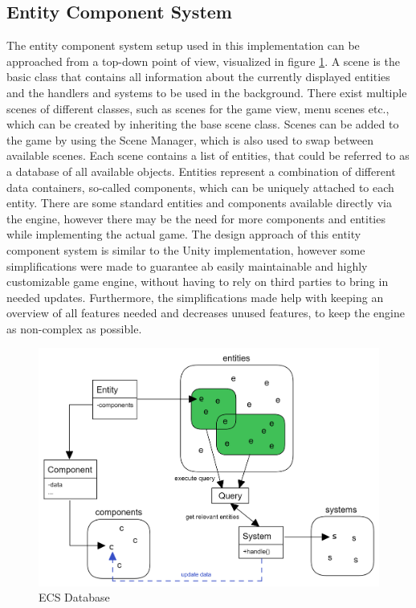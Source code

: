 \subsection{Entity Component System}\label{subsec:entity-component-system-implementation}
The entity component system setup used in this implementation can be approached from a top-down point of view, visualized in figure \ref{fig:ecs}.
A scene is the basic class that contains all information about the currently displayed entities and the handlers and systems to be used
in the background.
There exist multiple scenes of different classes, such as scenes for the game view, menu scenes etc., which can be created by
inheriting the base scene class.
Scenes can be added to the game by using the Scene Manager, which is also used to swap between available scenes.
Each scene contains a list of entities, that could be referred to as a database of all available objects.
Entities represent a combination of different data containers, so-called components, which can be uniquely attached to each entity.
There are some standard entities and components available directly via the engine, however there may be the need for more components and entities while implementing the actual game.
The design approach of this entity component system is similar to the Unity implementation, however some simplifications were made to guarantee ab easily maintainable
and highly customizable game engine, without having to rely on third parties to bring in needed updates.
Furthermore, the simplifications made help with keeping an overview of all features needed and decreases unused features, to keep the engine as non-complex as possible.
\begin{figure}
    \centering
    \includegraphics[width=\textwidth]{Pictures/res/implementation/ecs-database}
    \caption{ECS Database}
    \label{fig:ecs}
\end{figure}
